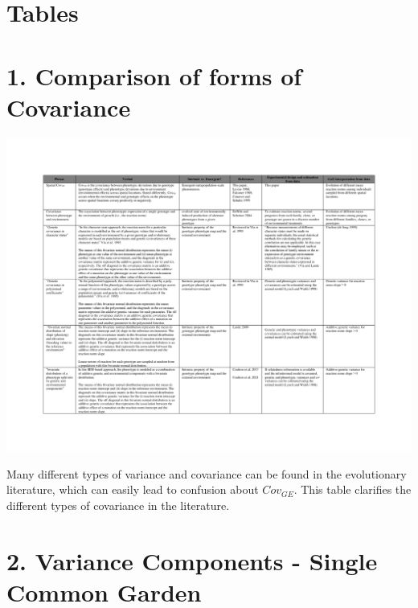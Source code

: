 \documentclass[11pt, oneside]{amsart}
\begin{document}
\clearpage
\newpage

\renewcommand\thesection{Supplemental Tables}

\section{Tables}

\renewcommand{\figurename}{Supplementary Table}

\section{1. Comparison of forms of Covariance}

\renewcommand\thefigure{T1}
\begin{table}[h]
\begin{center}
\includegraphics[width=7.5in]{Figs/Table1_CovarianceForms.pdf}
\end{center}
\label{Table: Covariance literature comparison}
\caption[A comparison of different types of covariance found in evolutionary literature]{Many different types of variance and covariance can be found in the evolutionary literature, which can easily lead to confusion about $Cov_{GE}$. This table clarifies the different types of covariance in the literature.}
\end{table}
 
\clearpage
\newpage

\section{2. Variance Components - Single Common Garden}
\end{document}
